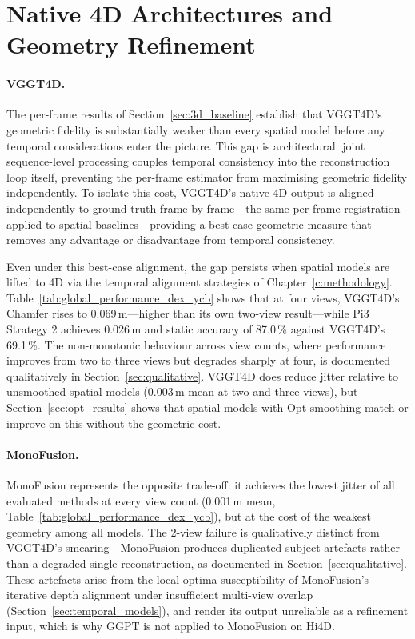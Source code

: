 \section{Native 4D Architectures and Geometry Refinement}
\label{sec:native4d_baselines}

\paragraph{VGGT4D.}
The per-frame results of Section~\ref{sec:3d_baseline} establish that VGGT4D's
geometric fidelity is substantially weaker than every spatial model before any
temporal considerations enter the picture. This gap is architectural: joint
sequence-level processing couples temporal consistency into the reconstruction
loop itself, preventing the per-frame estimator from maximising geometric fidelity
independently. To isolate this cost, VGGT4D's native 4D output is aligned
independently to ground truth frame by frame---the same per-frame registration
applied to spatial baselines---providing a best-case geometric measure that removes
any advantage or disadvantage from temporal consistency.

Even under this best-case alignment, the gap persists when spatial models are
lifted to 4D via the temporal alignment strategies of Chapter~\ref{c:methodology}.
Table~\ref{tab:global_performance_dex_ycb} shows that at four views, VGGT4D's
Chamfer rises to 0.069\,m---higher than its own two-view result---while Pi3
Strategy 2 achieves 0.026\,m and static accuracy of 87.0\,\% against VGGT4D's
69.1\,\%. The non-monotonic behaviour across view counts, where performance
improves from two to three views but degrades sharply at four, is documented
qualitatively in Section~\ref{sec:qualitative}. VGGT4D does reduce jitter
relative to unsmoothed spatial models (0.003\,m mean at two and three views),
but Section~\ref{sec:opt_results} shows that spatial models with Opt smoothing
match or improve on this without the geometric cost.

\paragraph{MonoFusion.}
MonoFusion represents the opposite trade-off: it achieves the lowest jitter of
all evaluated methods at every view count (0.001\,m mean,
Table~\ref{tab:global_performance_dex_ycb}), but at the cost of the weakest
geometry among all models. The 2-view failure is qualitatively distinct from
VGGT4D's smearing---MonoFusion produces duplicated-subject artefacts rather than
a degraded single reconstruction, as documented in Section~\ref{sec:qualitative}.
These artefacts arise from the local-optima susceptibility of MonoFusion's
iterative depth alignment under insufficient multi-view overlap
(Section~\ref{sec:temporal_models}), and render its output unreliable as a
refinement input, which is why GGPT is not applied to MonoFusion on Hi4D.

